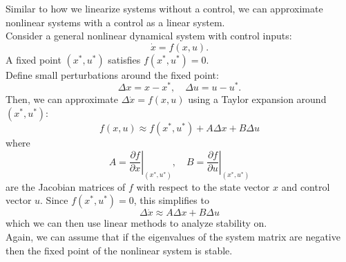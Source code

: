 \documentclass[12pt]{article}
\newcommand{\dx}{\dot{x}}
\begin{document}
Similar to how we linearize systems without a control, we can approximate nonlinear systems with a control as a linear system. \\

Consider a general nonlinear dynamical system with control inputs:
$$\dx = f(x, u).$$
A fixed point $(x^*, u^*)$ satisfies $f(x^*, u^*) = 0$. \\

Define small perturbations around the fixed point:
$$\Delta x = x - x^*, \quad \Delta u = u - u^*.$$
Then, we can approximate $\Delta \dx = f(x, u)$ using a Taylor expansion around $(x^*, u^*)$:
$$f(x, u) \approx f(x^*, u^*) + A\Delta x + B\Delta u$$
where
$$A = \left. \frac{\partial f}{\partial x}\right|_{(x^*, u^*)}, \quad B = \left. \frac{\partial f}{\partial u}\right|_{(x^*, u^*)}$$
are the Jacobian matrices of $f$ with respect to the state vector $x$ and control vector $u$. Since $f(x^*, u^*) = 0$, this simplifies to
$$\Delta \dx \approx A\Delta x + B\Delta u$$
which we can then use linear methods to analyze stability on. \\

Again, we can assume that if the eigenvalues of the system matrix are negative then the fixed point of the nonlinear system is stable. \\
\end{document}
